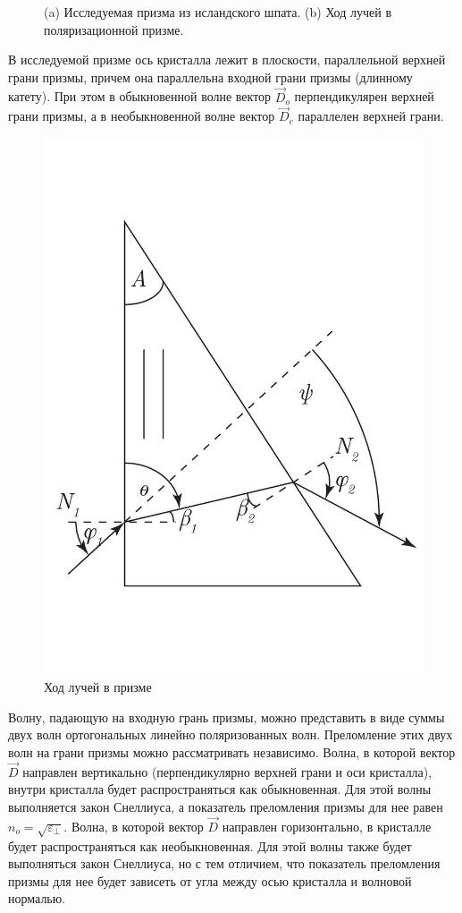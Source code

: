 \documentclass[a4paper, 12pt]{article}
\begin{document}
\begin{figure}[h]
		\caption{(a) Исследуемая призма из исландского шпата. (b) Ход лучей в поляризационной призме.}
		\label{fig:prismAndRaypath}
	\end{figure}
	\par
	В исследуемой призме ось кристалла лежит в плоскости, параллельной верхней грани призмы, причем она параллельна входной грани призмы (длинному катету). При этом в обыкновенной волне вектор $\vec{D}_o$ перпендикулярен верхней грани призмы, а в необыкновенной волне вектор $\vec{D}_e$ параллелен верхней грани.\par
	\begin{figure}
		\centering
		\includegraphics[scale=0.2]{Ray_Path_2.pdf}
		\caption{Ход лучей в призме}
		\label{fig:Ray_Path_2}
	\end{figure}
	Волну, падающую на входную грань призмы, можно представить в виде суммы двух волн ортогональных линейно поляризованных волн. Преломление этих двух волн на грани призмы можно рассматривать независимо. Волна, в которой вектор $\vec{D}$ направлен вертикально (перпендикулярно верхней грани и оси кристалла), внутри кристалла будет распространяться как обыкновенная. Для этой волны выполняется закон Снеллиуса, а показатель преломления призмы для нее равен $n_o=\sqrt{\varepsilon_\perp}$. Волна, в которой вектор $\vec{D}$ направлен горизонтально, в кристалле будет распространяться как необыкновенная. Для этой волны также будет выполняться закон Снеллиуса, но с тем отличием, что показатель преломления призмы для нее будет зависеть от угла между осью кристалла и волновой нормалью.\par
\end{document}
